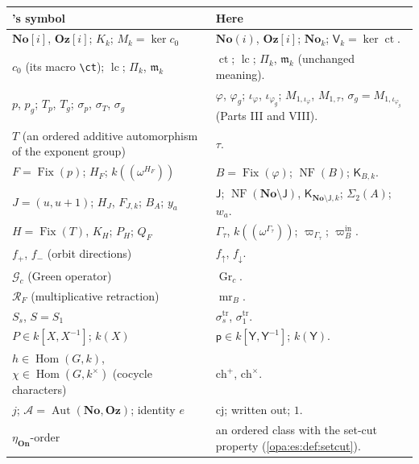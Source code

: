 \documentclass[11pt,oneside]{article}
\numberwithin{equation}{section}
\theoremstyle{definition}
\theoremstyle{remark}
\newcommand{\No}{\mathbf{No}}
\newcommand{\Oz}{\mathbf{Oz}}
\newcommand{\Og}{\mathbf{Oz}[i]}
\newcommand{\SC}{\mathbf{No}(i)}
\newcommand{\mm}{\mathfrak m}
\newcommand{\Aut}{\operatorname{Aut}}
\newcommand{\Hom}{\operatorname{Hom}}
\newcommand{\lc}{\operatorname{lc}}
\newcommand{\ct}{\operatorname{ct}}
\newcommand{\Fix}{\operatorname{Fix}}
\newcommand{\On}{\mathbf{On}}
\newcommand{\NF}{\operatorname{NF}}
\begin{document}
\begin{center}
\renewcommand{\arraystretch}{1.15}
\begin{longtable}{>{\raggedright\arraybackslash}p{}>{\raggedright\arraybackslash}p{}}
\toprule
20's symbol & Here\\
\midrule
\endhead
$\No[i]$, $\Oz[i]$; $K_k$; $M_k=\ker c_0$ & $\SC$, $\Og$; $\No_k$; $\mathsf V_k=\ker\ct$.\\
$c_0$ (its macro \texttt{\textbackslash ct}); $\lc$; $\Pi_k$, $\mathfrak m_k$ & $\ct$; $\lc$; $\Pi_k$, $\mm_k$ (unchanged meaning).\\
$p$, $p_g$; $T_p$, $T_g$; $\sigma_p$, $\sigma_T$, $\sigma_g$ & $\varphi$, $\varphi_g$; $\iota_\varphi$, $\iota_{\varphi_g}$; $M_{1,\iota_\varphi}$,
$M_{1,\tau}$, $\sigma_g=M_{1,\iota_{\varphi_g}}$ (Parts III and VIII).\\
$T$ (an ordered additive automorphism of the exponent group) & $\tau$.\\
$F=\Fix(p)$; $H_F$; $k((\omega^{H_F}))$ & $B=\Fix(\varphi)$; $\NF(B)$; $\mathsf K_{B,k}$.\\
$J=(u,u+1)$; $H_J$, $F_{J,k}$; $B_A$; $y_a$ & $\mathsf J$; $\NF(\No\setminus\mathsf J)$, $\mathsf K_{\No\setminus\mathsf J,k}$; $\Sigma_2(A)$; $w_a$.\\
$H=\Fix(T)$, $K_H$; $P_H$; $Q_F$ & $\Gamma_\tau$, $k((\omega^{\Gamma_\tau}))$; $\varpi_{\Gamma_\tau}$; $\varpi^{\mathrm{in}}_B$.\\
$f_+$, $f_-$ (orbit directions) & $f_\uparrow$, $f_\downarrow$.\\
$\mathcal G_c$ (Green operator) & $\operatorname{Gr}_c$.\\
$\mathcal R_F$ (multiplicative retraction) & $\operatorname{mr}_B$.\\
$S_s$, $S=S_1$ & $\sigma^{\mathrm{tr}}_s$, $\sigma^{\mathrm{tr}}_1$.\\
$P\in k[X,X^{-1}]$; $k(X)$ & $\mathsf p\in k[\mathsf Y,\mathsf Y^{-1}]$; $k(\mathsf Y)$.\\
$h\in\Hom(G,k)$, $\chi\in\Hom(G,k^\times)$ (cocycle characters) & $\mathrm{ch}^+$, $\mathrm{ch}^\times$.\\
$j$; $\mathcal A=\Aut(\No,\Oz)$; identity $e$ & $\mathrm{cj}$; written out; $1$.\\
$\eta_{\On}$-order & an ordered class with the set-cut property (\cref{opa:es:def:setcut}).\\
\bottomrule
\end{longtable}
\end{center}
\end{document}
